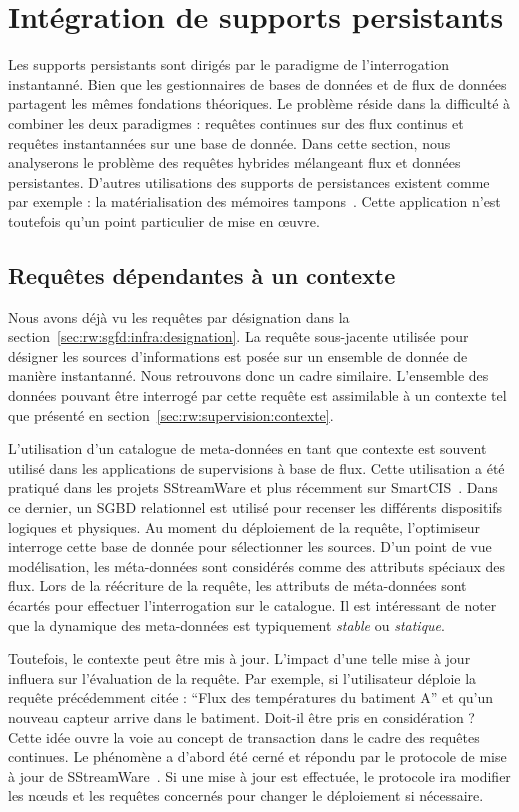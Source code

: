 \section{Intégration de supports persistants}\label{sec:rw:sgfd:persistance}
Les supports persistants sont dirigés par le paradigme de l'interrogation instantanné. Bien que les gestionnaires de bases de données et de flux de données partagent les mêmes fondations théoriques. Le problème réside dans la difficulté à combiner les deux paradigmes : requêtes continues sur des flux continus et requêtes instantannées sur une base de donnée. Dans cette section, nous analyserons le problème des requêtes hybrides mélangeant flux et données persistantes. D'autres utilisations des supports de persistances existent comme par exemple : la matérialisation des mémoires tampons~\cite{Abadi:aurora}. Cette application n'est toutefois qu'un point particulier de mise en œuvre.

\subsection{Requêtes dépendantes à un contexte}
Nous avons déjà vu les requêtes par désignation dans la section~\ref{sec:rw:sgfd:infra:designation}. La requête sous-jacente utilisée pour désigner les sources d'informations est posée sur un ensemble de donnée de manière instantanné. Nous retrouvons donc un cadre similaire. L'ensemble des données pouvant être interrogé par cette requête est assimilable à un contexte tel que présenté en section~\ref{sec:rw:supervision:contexte}.

L'utilisation d'un catalogue de meta-données en tant que contexte est souvent utilisé dans les applications de supervisions à base de flux. Cette utilisation a été pratiqué dans les projets SStreamWare et plus récemment sur SmartCIS~\cite{Liu:smartcis}. Dans ce dernier, un SGBD relationnel est utilisé pour recenser les différents dispositifs logiques et physiques. Au moment du déploiement de la requête, l'optimiseur interroge cette base de donnée pour sélectionner les sources. D'un point de vue modélisation, les méta-données sont considérés comme des attributs spéciaux des flux. Lors de la réécriture de la requête, les attributs de méta-données sont écartés pour effectuer l'interrogation sur le catalogue. Il est intéressant de noter que la dynamique des meta-données est typiquement \textit{stable} ou \textit{statique}.

Toutefois, le contexte peut être mis à jour. L'impact d'une telle mise à jour influera sur l'évaluation de la requête. Par exemple, si l'utilisateur déploie la requête précédemment citée : \enquote{Flux des températures du batiment A} et qu'un nouveau capteur arrive dans le batiment. Doit-il être pris en considération ? Cette idée ouvre la voie au concept de transaction dans le cadre des requêtes continues. Le phénomène a d'abord été cerné et répondu par le protocole de mise à jour de SStreamWare~\cite{Gurgen:transaction}. Si une mise à jour est effectuée, le protocole ira modifier les nœuds et les requêtes concernés pour changer le déploiement si nécessaire.

